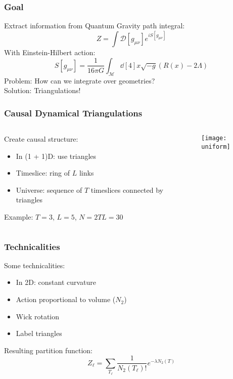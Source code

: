 
\begin{frame}
    \frametitle{Goal}
    Extract information from Quantum Gravity path integral:
    \begin{equation}
        Z = \int \mathcal{D}[g_{\mu \nu}] e^{i S[g_{\mu \nu}]}
    \end{equation}
    With Einstein-Hilbert action:
    \begin{equation}
        S[g_{\mu \nu}]
        =
        \frac{1}{16 \pi G}
        \int_\mathcal{M} \dd[4]{x} \sqrt{-g}
        (R(x) - 2 \Lambda)
    \end{equation}
    Problem: How can we integrate over geometries? \\
    Solution: Triangulations!
\end{frame}

\begin{frame}
    \frametitle{Causal Dynamical Triangulations}
    \begin{columns}
        \begin{column}{0.7\textwidth}
            Create causal structure:
            \begin{itemize}
                \item In (1 + 1)D: use triangles
                \item Timeslice: ring of $L$ links
                \item Universe: sequence of $T$ timeslices connected by triangles
            \end{itemize}
            Example: $T = 3$, $L = 5$, $N = 2TL = 30$
        \end{column}
        \begin{column}{0.3\textwidth}
            \texttt{[image: uniform]}
        \end{column}
    \end{columns}
\end{frame}

\begin{frame}
    \frametitle{Technicalities}
    Some technicalities:
    \begin{itemize}
        \item In 2D: constant curvature
        \item Action proportional to volume ($N_2$)
        \item Wick rotation
        \item Label triangles
    \end{itemize}
    Resulting partition function:
    \begin{equation}
        Z_\ell = \sum _{T_\ell} \frac{1}{N_2(T_\ell)!} e^{-\lambda N_2(T)}
    \end{equation}
\end{frame}